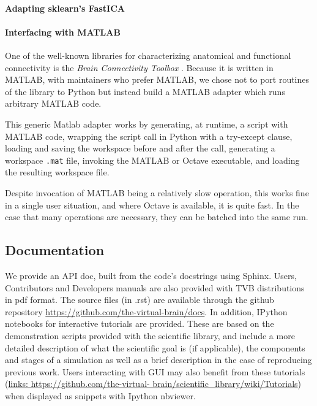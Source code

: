 \paragraph{Adapting sklearn's FastICA}




\paragraph{Interfacing with MATLAB}

One of the well-known libraries for characterizing anatomical 
and functional connectivity is the \emph{Brain Connectivity Toolbox} 
\cite{Rubinov_2010}. 
Because it is written in MATLAB, with maintainers who prefer MATLAB, we 
chose not to port routines of the library to Python but instead build
a MATLAB adapter which runs arbitrary MATLAB code. 

This generic Matlab adapter works by generating, at runtime, a script with MATLAB code, 
wrapping the script call in Python with a try-except clause,  
loading and saving the workspace before and after the call,
generating a workspace \texttt{.mat} file, invoking the MATLAB or Octave
executable, and loading the resulting workspace file. 

Despite invocation of MATLAB being a relatively slow operation, this works fine in a single
user situation, and where Octave is available, it is quite fast. In the 
case that many operations are necessary, they can be batched into the 
same run.

\subsection{Documentation}

We provide an API doc, built from the code's docstrings using Sphinx.
Users, Contributors and Developers manuals are also provided with TVB
distributions in pdf format. The source files (in .rst) are available
through the github repository \url{https://github.com/the-virtual-brain/docs}.  
In addition, IPython \cite{PerezGranger_2007} notebooks
for interactive tutorials are provided. These are based on the
demonstration scripts provided with the scientific library, and
include a more detailed description of what the scientific goal is (if
applicable), the components and stages of a simulation as well as a
brief description in the case of reproducing previous work. Users
interacting with \TVB GUI may also benefit from these tutorials
(\url{links: https://github.com/the-virtual-
brain/scientific_library/wiki/Tutorials}) when displayed as snippets
with Ipython nbviewer. 

